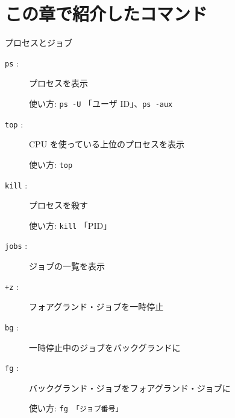 \section*{この章で紹介したコマンド}

\begin{center}
\begin{minipage}{13cm}
\begin{itembox}[l]{プロセスとジョブ}
\begin{description}
\item[\texttt{ps} :] プロセスを表示

使い方: \texttt{ps -U} 「ユーザ ID」、\texttt{ps -aux}

\item[\texttt{top} :] CPU を使っている上位のプロセスを表示

使い方: \texttt{top}

\item[\texttt{kill} :] プロセスを殺す

使い方: \texttt{kill} 「PID」

\item[\texttt{jobs} :] ジョブの一覧を表示

\item[\texttt{+\texttt{z}} :] フォアグランド・ジョブを一時停止

\item[\texttt{bg} :] 一時停止中のジョブをバックグランドに

\item[\texttt{fg} :] バックグランド・ジョブをフォアグランド・ジョブに

使い方: \texttt{fg 「ジョブ番号」}
\end{description}
\end{itembox}
\end{minipage}
\end{center}
